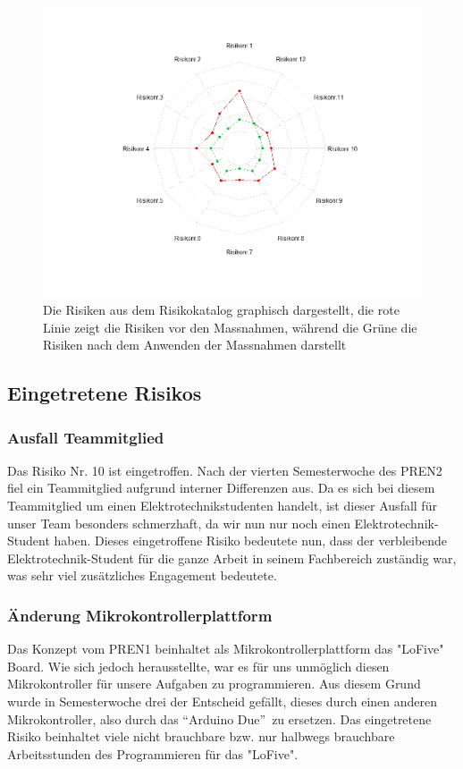 \documentclass[a4paper]{report}
\begin{document}
\begin{figure}[h!]
	\centering
	\includegraphics[width=\textwidth,keepaspectratio]{Risikomatrix_Spinne}
	\caption{Die Risiken aus dem Risikokatalog graphisch dargestellt, die rote Linie zeigt die Risiken vor den Massnahmen, während die Grüne die Risiken nach dem Anwenden der Massnahmen darstellt}
	\label{fig:Risikomatrix_Spinne}
\end{figure}

\subsection{Eingetretene Risikos}
\label{ch:EingetreteneRisikos}
\subsubsection{Ausfall Teammitglied}
Das Risiko Nr. 10 ist eingetroffen. Nach der vierten Semesterwoche des PREN2 fiel ein Teammitglied aufgrund interner Differenzen aus. Da es sich bei diesem Teammitglied um einen Elektrotechnikstudenten handelt, ist dieser Ausfall für unser Team besonders schmerzhaft, da wir nun nur noch einen Elektrotechnik-Student haben. Dieses eingetroffene Risiko bedeutete nun, dass der verbleibende Elektrotechnik-Student für die ganze Arbeit in seinem Fachbereich zuständig war, was sehr viel zusätzliches Engagement bedeutete.

\subsubsection{Änderung Mikrokontrollerplattform}
\label{ch:ÄnderungMikrokontroller}
Das Konzept vom PREN1 beinhaltet als Mikrokontrollerplattform das "LoFive" Board. Wie sich jedoch herausstellte, war es für uns unmöglich diesen Mikrokontroller für unsere Aufgaben zu programmieren. Aus diesem Grund wurde in Semesterwoche drei der Entscheid gefällt, dieses durch einen anderen Mikrokontroller, also durch das \textquotedblleft Arduino Due\textquotedblright\ zu ersetzen. Das eingetretene Risiko beinhaltet viele nicht brauchbare bzw. nur halbwegs brauchbare Arbeitsstunden des Programmieren für das "LoFive".
\end{document}
